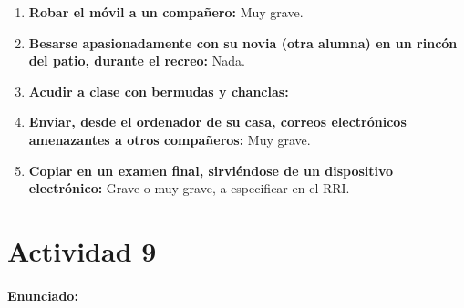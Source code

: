 {\begin{enumerate}
	\item \textbf{Robar el móvil a un compañero: } Muy grave.

	\item \textbf{Besarse apasionadamente con su novia (otra alumna) en un rincón del patio, durante el recreo: } Nada.

	\item \textbf{Acudir a clase con bermudas y chanclas: } 
	\item \textbf{Enviar, desde el ordenador de su casa, correos electrónicos amenazantes a otros compañeros: } Muy grave.

	\item \textbf{Copiar en un examen final, sirviéndose de un dispositivo electrónico: } Grave o muy grave, a especificar en el RRI.

\end{enumerate}


\newpage
\section*{Actividad 9}
\paragraph{Enunciado: }

}
